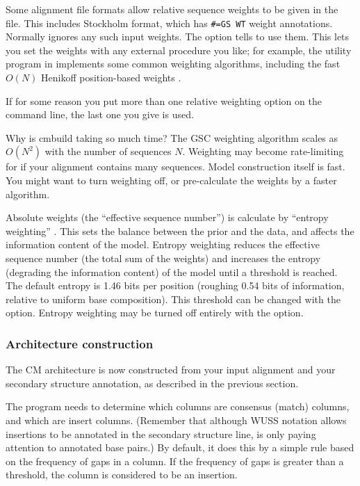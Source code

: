 Some alignment file formats allow relative sequence weights to be
given in the file. This includes Stockholm format, which has
\verb+#=GS WT+ weight annotations. Normally  ignores any
such input weights.  The  option tells 
to use them.  This lets you set the weights with any external
procedure you like; for example, the  utility program in
 implements some common weighting algorithms,
including the fast $O(N)$ Henikoff position-based weights
\cite{Henikoff94b}.

If for some reason you put more than one relative weighting option on
the command line, the last one you give is used.

\begin{srefaq}{Why is cmbuild taking so much time?} The GSC weighting algorithm
scales as $O(N^2)$ with the number of sequences $N$. Weighting may
become rate-limiting for  if your alignment contains
many sequences. Model construction itself is fast. You might want to
turn weighting off, or pre-calculate the weights by a faster
algorithm.
\end{srefaq}

Absolute weights (the ``effective sequence number'') is calculate by
``entropy weighting'' \cite{Karplus98}. This sets the balance between
the prior and the data, and affects the information content of the
model. Entropy weighting reduces the effective sequence number (the
total sum of the weights) and increases the entropy (degrading the
information content) of the model until a threshold is reached. The
default entropy is 1.46 bits per position (roughing 0.54 bits of
information, relative to uniform base composition). This threshold can
be changed with the  option. Entropy weighting may
be turned off entirely with the  option.


\subsubsection{Architecture construction}

The CM architecture is now constructed from your input alignment and
your secondary structure annotation, as described in the previous
section. 

The program needs to determine which columns are consensus (match)
columns, and which are insert columns. (Remember that although WUSS
notation allows insertions to be annotated in the secondary structure
line,  is only paying attention to annotated base
pairs.) By default, it does this by a simple rule based on the
frequency of gaps in a column. If the frequency of gaps is greater
than a threshold, the column is considered to be an insertion. 


